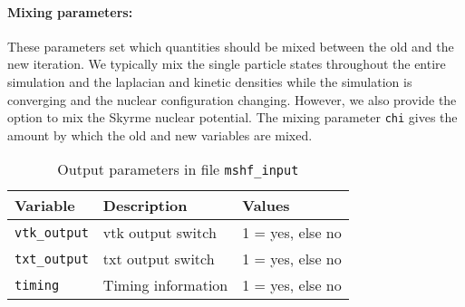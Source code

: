 \documentclass[4p]{elsarticle}
\begin{document}
\paragraph{Mixing parameters: } These parameters set which quantities should be mixed between the old and the new iteration. We typically mix the single particle states throughout the entire simulation and the laplacian and kinetic densities while the simulation is converging and the nuclear configuration changing. However, we also provide the option to mix the Skyrme nuclear potential. The mixing parameter {\tt chi} gives the amount by which the old and new variables are mixed. 
\begin{table}
\caption{Output parameters in file \texttt{mshf\_input}}
\begin{tabular*}{\columnwidth}{ l l l}
\hline
\hline
Variable & Description & Values\\
\hline
\texttt{vtk\_output}       & vtk output switch                               & 1 = yes, else no\\
\texttt{txt\_output}        & txt output switch                               & 1 = yes, else no\\
\texttt{timing}               & Timing information                           & 1 = yes, else no\\
\hline
\hline
\end{tabular*}
\label{table4}
\end{table}
\end{document}
